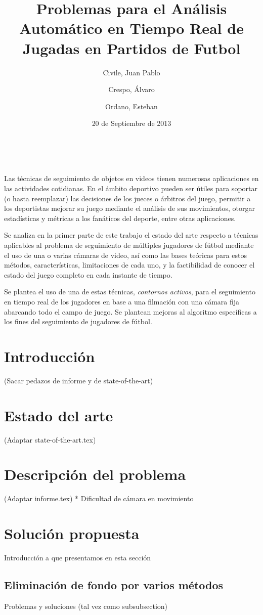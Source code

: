 \documentclass[a4paper,10pt]{article}
\title{Problemas para el Análisis Automático en Tiempo Real de Jugadas en Partidos de Futbol}
\date{20 de Septiembre de 2013}
\author{Civile, Juan Pablo \and Crespo, Álvaro \and Ordano, Esteban }
\def\customabstract{\vspace{.5em}
    {\small\center{\textbf{RESUMEN}} \\[0.5em] \relax%
    }}
\begin{document}
\customabstract{
Las técnicas de seguimiento de objetos en videos tienen numerosas aplicaciones
en las actividades cotidianas. En el ámbito deportivo pueden ser útiles para
soportar (o hasta reemplazar) las decisiones de los jueces o árbitros del
juego, permitir a los deportistas mejorar su juego mediante el análisis de sus
movimientos, otorgar estadísticas y métricas a los fanáticos del deporte, entre
otras aplicaciones.

Se analiza en la primer parte de este trabajo el estado del arte respecto a
técnicas aplicables al problema de seguimiento de múltiples jugadores de fútbol
mediante el uso de una o varias cámaras de video, así como las bases teóricas
para estos métodos, características, limitaciones de cada uno, y la
factibilidad de conocer el estado del juego completo en cada instante de
tiempo.

Se plantea el uso de una de estas técnicas, \textit{contornos activos}, para
el seguimiento en tiempo real de los jugadores en base a una filmación
con una cámara fija abarcando todo el campo de juego. Se plantean mejoras
al algoritmo específicas a los fines del seguimiento de jugadores de fútbol.
}

\section{Introducción}

(Sacar pedazos de informe y de state-of-the-art)

\section{Estado del arte}

(Adaptar state-of-the-art.tex)

\section{Descripción del problema}

(Adaptar informe.tex)
  * Dificultad de cámara en movimiento

\section{Solución propuesta}

Introducción a que presentamos en esta sección

\subsection{Eliminación de fondo por varios métodos}
Problemas y soluciones (tal vez como subsubsection)
\end{document}
